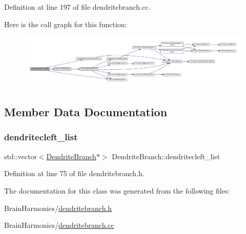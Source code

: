 Definition at line 197 of file dendritebranch.\+cc.

Here is the call graph for this function\+:\nopagebreak
\begin{figure}[H]
\begin{center}
\leavevmode
\includegraphics[width=350pt]{class_dendrite_branch_a8540dfafeb5bd45f782ab31b8231b10f_cgraph}
\end{center}
\end{figure}


\subsection{Member Data Documentation}
\mbox{\label{class_dendrite_branch_a8015119958f7581d826dcac2c21919c9}} 
\subsubsection{\texorpdfstring{dendritecleft\+\_\+list}{dendritecleft\_list}}
{\footnotesize\ttfamily std\+::vector$<$\mbox{\hyperlink{class_dendrite_branch}{Dendrite\+Branch}}$\ast$$>$ Dendrite\+Branch\+::dendritecleft\+\_\+list\hspace{0.3cm}{\ttfamily [protected]}}



Definition at line 75 of file dendritebranch.\+h.



The documentation for this class was generated from the following files\+:\begin{DoxyCompactItemize}
\item 
Brain\+Harmonics/\mbox{\hyperlink{dendritebranch_8h}{dendritebranch.\+h}}\item 
Brain\+Harmonics/\mbox{\hyperlink{dendritebranch_8cc}{dendritebranch.\+cc}}\end{DoxyCompactItemize}
